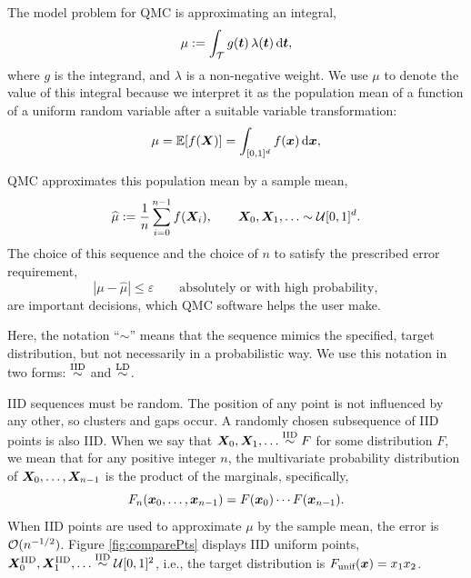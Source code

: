 \documentclass[graybox,footinfo]{svmult}
\newcommand{\QMCPYabs}[1]{\ensuremath{{\left \lvert #1 \right \rvert}}}
\newcommand{\hmu}{\widehat{\mu}}
\newcommand{\IID}{\textup{IID}}
\newcommand{\LD}{\textup{LD}}
\newcommand{\unif}{\textup{unif}}
\newcommand{\IIDsim}{\overset{\IID}{\sim}}
\newcommand{\LDsim}{\overset{\LD}{\sim}}
\newcommand{\cube}{[0,1]^d}
\begin{document}
The model problem for QMC is approximating an integral,
\begin{equation} \label{eq:integral}
	\mu := \int_\calT g(\bst) \, \lambda(\bst) \, \D \bst,
\end{equation}
where $g$ is the integrand, and $\lambda$ is a non-negative weight.  We use $\mu$ to denote the value of this integral because we interpret it as the population mean of a function of a uniform random variable after a suitable variable transformation:
\begin{equation} \label{eq:fintegral}
	\mu = \bbE[f(\bsX)] =  \int_{\cube}  f(\bsx) \,  \D \bsx ,
\end{equation}

QMC approximates this population mean by a sample mean,
\begin{equation} \label{eq:samplemean}
	\hmu := \frac 1n \sum_{i=0}^{n-1} f(\bsX_i), \qquad \bsX_0, \bsX_1, \ldots \sim \calU\cube.
\end{equation}
The choice of this sequence and the choice of $n$ to satisfy  the prescribed error requirement,
\begin{equation} \label{eq:err_req}
	\QMCPYabs{\mu - \hmu} \le \varepsilon \qquad \text{absolutely or with high probability},
\end{equation} 
are important decisions, which  QMC software helps the user make.

Here, the notation ``$\sim$'' means that the sequence mimics the specified, target distribution, but not necessarily in a probabilistic way.  We  use this notation in two forms:  $\IIDsim$ and $\LDsim$.

IID sequences must be random. The position of any point is not influenced by any other, so clusters and gaps occur.  A randomly chosen subsequence of IID points is also IID.  When we say that $\bsX_0, \bsX_1, \ldots \IIDsim F$ for some distribution $F$, we mean that for any positive integer $n$, the  multivariate probability distribution of ${\boldsymbol{X}}_0, \ldots, {\boldsymbol{X}}_{n-1}$ is the product of the marginals, specifically,
\begin{equation*}
	F_{n}({\boldsymbol{x}}_0, \ldots, {\boldsymbol{x}}_{n-1}) = F({\boldsymbol{x}}_0) \cdots  F({\boldsymbol{x}}_{n-1}).
\end{equation*}
When IID points are used to approximate $\mu$ by the sample mean, the error is ${\mathcal{O}}(n^{-1/2})$.  Figure \ref{fig:comparePts} displays IID uniform points, $\bsX^{\IID}_0, \bsX^{\IID}_1, \ldots \IIDsim \calU[0,1]^2$, i.e.,  the target distribution is $F_\unif(\bsx) = x_1 x_2$.
\end{document}
